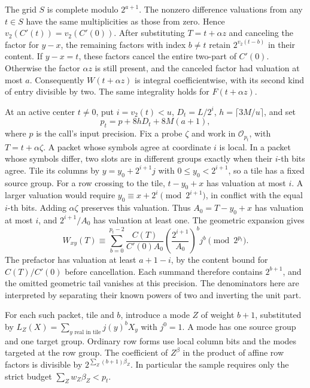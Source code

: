\documentclass[
  11pt,
]{article}
\newcommand{\ceil}[1]{\lceil #1\rceil}
\begin{document}
The grid \(S\) is complete modulo \(2^{a+1}\).
The nonzero difference valuations from any \(t\in S\) have
the same multiplicities as those from zero. Hence
\(v_2(C'(t))=v_2(C'(0))\).
After substituting \(T=t+\alpha z\) and canceling the factor for
\(y-x\), the remaining factors with index \(b\ne t\) retain
\(2^{v_2(t-b)}\) in their content. If \(y-x=t\), these factors
cancel the entire two-part of \(C'(0)\). Otherwise the factor
\(\alpha z\) is still present, and the canceled factor had
valuation at most \(a\). Consequently \(W(t+\alpha z)\) is
integral coefficientwise, with its second kind of entry divisible
by two. The same integrality holds for \(F(t+\alpha z)\).

At an active center \(t\ne0\), put \(i=v_2(t)<u\),
\(D_t=L/2^i\), \(h=\ceil{3M/u}\), and set
\[
                  p_t=p+8hD_t+8M(a+1),
\]
where \(p\) is the call's input precision. Fix a probe
\(\zeta\) and work in \(\mathcal O_{p_t}\), with \(T=t+\alpha\zeta\).
A packet whose symbols agree at coordinate \(i\) is local.
In a packet whose symbols differ, two slots are in different
groups exactly when their \(i\)-th bits agree. Tile its columns by
\(y=y_0+2^{i+1}j\) with \(0\le y_0<2^{i+1}\), so a tile has a
fixed source group. For a row crossing to the tile,
\(t-y_0+x\) has valuation at most \(i\). A larger valuation would
require \(y_0\equiv x+2^i\pmod{2^{i+1}}\), in conflict with
the equal \(i\)-th bits. Adding \(\alpha\zeta\) preserves this
valuation. Thus \(A_0=T-y_0+x\) has valuation at most \(i\),
and \(2^{i+1}/A_0\) has valuation at least one. The geometric
expansion gives
\[
 W_{xy}(T)\equiv
 \sum_{b=0}^{p_t-2}
      \frac{C(T)}{C'(0)A_0}
      \left(\frac{2^{i+1}}{A_0}\right)^b j^b
 \pmod{2^{p_t}}.
\]
The prefactor has valuation at least \(a+1-i\), by the
content bound for \(C(T)/C'(0)\) before cancellation.
Each summand therefore contains \(2^{b+1}\), and the omitted
geometric tail vanishes at this precision. The denominators here
are interpreted by separating their known powers of two and
inverting the unit part.

For each such packet, tile and \(b\), introduce a mode \(Z\) of
weight \(b+1\), substituted by
\(L_Z(X)=\sum_{y\text{ real in tile}} j(y)^b X_y\)
with \(j^0=1\). A mode has one source group and one target group.
Ordinary row forms use local column bits and the modes targeted
at the row group. The coefficient of \(Z^\beta\) in the product
of affine row factors is divisible by
\(2^{\sum_Z(b+1)\beta_Z}\). In particular the sample requires
only the strict budget \(\sum_Z w_Z\beta_Z<p_t\).
\end{document}
